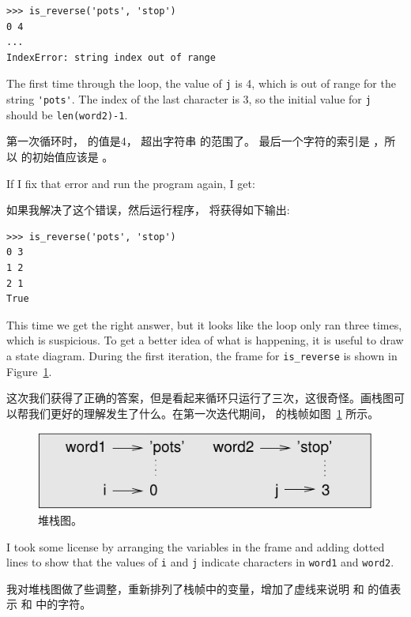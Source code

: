 \begin{lstlisting}
>>> is_reverse('pots', 'stop')
0 4
...
IndexError: string index out of range
\end{lstlisting}

%
The first time through the loop, the value of {\tt j} is 4,
which is out of range for the string \verb"'pots'".
The index of the last character is 3, so the
initial value for {\tt j} should be {\tt len(word2)-1}.

第一次循环时，  的值是4， 超出字符串  的范围了。 最后一个字符的索引是 ，所以  的初始值应该是  。

If I fix that error and run the program again, I get:

如果我解决了这个错误，然后运行程序， 将获得如下输出:

\begin{lstlisting}
>>> is_reverse('pots', 'stop')
0 3
1 2
2 1
True
\end{lstlisting}

%
This time we get the right answer, but it looks like the loop only ran
three times, which is suspicious.  To get a better idea of what is
happening, it is useful to draw a state diagram.  During the first
iteration, the frame for \verb"is_reverse" is shown in
Figure~\ref{fig.state4}.   

这次我们获得了正确的答案，但是看起来循环只运行了三次，这很奇怪。画栈图可以帮我们更好的理解发生了什么。在第一次迭代期间，  的栈帧如图~\ref{fig.state4} 所示。

\begin{figure}
\centerline
{\includegraphics[scale=0.8]{../source/figs/state4.pdf}}
\caption{堆栈图。}
\label{fig.state4}
\end{figure}

I took some license by arranging the variables in the frame
and adding dotted lines to show that the values of {\tt i} and
{\tt j} indicate characters in {\tt word1} and {\tt word2}.

我对堆栈图做了些调整，重新排列了栈帧中的变量，增加了虚线来说明  和  的值表示  和  中的字符。



